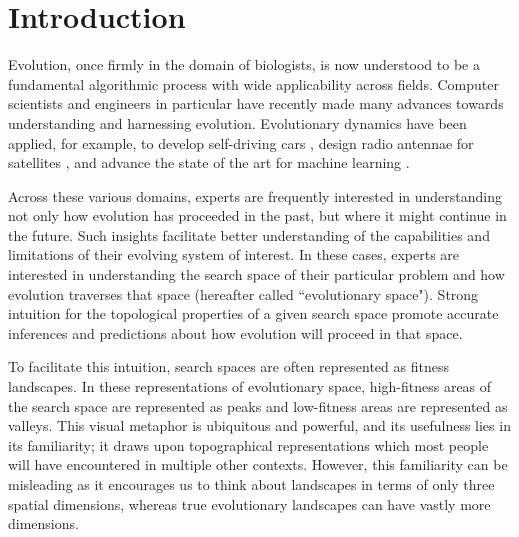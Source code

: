 \section{Introduction}

Evolution, once firmly in the domain of biologists, is now understood to be a fundamental algorithmic process with wide applicability across fields. 
Computer scientists and engineers in particular have recently made many advances towards understanding and harnessing evolution. 
Evolutionary dynamics have been applied, for example, to develop self-driving cars \citep{abuzekry_comparative_2019}, design radio antennae for satellites \citep{oreilly_evolved_2005} , and advance the state of the art for machine learning \citep{vikhar_evolutionary_2016}. 


Across these various domains, experts are frequently interested in understanding not only how evolution has proceeded in the past, but where it might continue in the future. 
Such insights facilitate better understanding of the capabilities and limitations of their evolving system of interest. 
In these cases, experts are interested in understanding the search space of their particular problem and how evolution traverses that space (hereafter called ``evolutionary space"). 
Strong intuition for the topological properties of a given search space promote accurate inferences and predictions about how evolution will proceed in that space.


To facilitate this intuition, search spaces are often represented as fitness landscapes.
In these representations of evolutionary space, high-fitness areas of the search space are represented as peaks and low-fitness areas are represented as valleys. 
This visual metaphor is ubiquitous and powerful, and its usefulness lies in its familiarity; it draws upon topographical representations which most people will have encountered in multiple other contexts. 
However, this familiarity can be misleading as it encourages us to think about landscapes in terms of only three spatial dimensions, whereas true evolutionary landscapes can have vastly more dimensions. 

